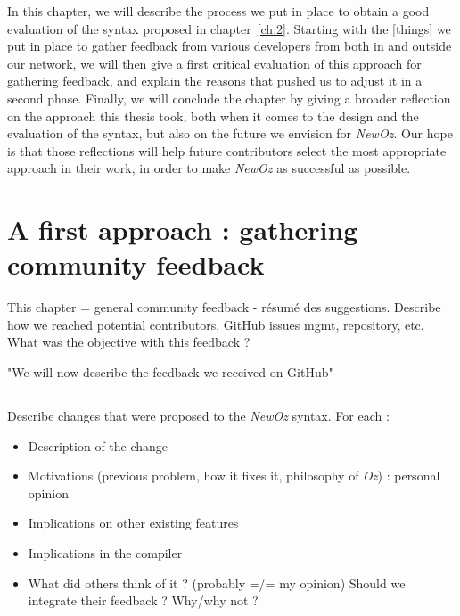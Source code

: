 
In this chapter, we will describe the process we put in place to obtain a good evaluation of the syntax proposed in chapter~\ref{ch:2}.
Starting with the [things] we put in place to gather feedback from various developers  from both in and outside our network,
we will then give a first critical evaluation of this approach for gathering feedback, and explain the reasons that pushed us to adjust it in a second phase.
Finally, we will conclude the chapter by giving a broader reflection on the approach this thesis took, both when it comes to the design and the evaluation of the syntax, but also on the future we envision for \textit{NewOz}.
Our hope is that those reflections will help future contributors select the most appropriate approach in their work, in order to make \textit{NewOz} as successful as possible.

\section{A first approach : gathering community feedback}\label{sec:ch4-GitHub}
This chapter = general community feedback - résumé des suggestions.\newline
Describe how we reached potential contributors, GitHub issues mgmt, repository, etc.
What was the objective with this feedback ?

"We will now describe the feedback we received on GitHub"
\subsection{}
Describe changes that were proposed to the \textit{NewOz} syntax.
For each :
\begin{itemize}
    \item Description of the change
    \item Motivations (previous problem, how it fixes it, philosophy of \textit{Oz}) : personal opinion
    \item Implications on other existing features
    \item Implications in the compiler
    \item What did others think of it ? (probably =/= my opinion) Should we integrate their feedback ? Why/why not ?
\end{itemize}

